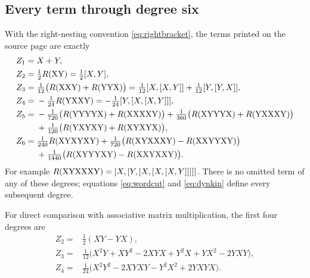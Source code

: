 \subsection{Every term through degree six}
With the right-nesting convention \eqref{eq:rightbracket}, the terms printed
on the source page are exactly
\begin{align}
 Z_1={}&X+Y,\label{eq:z1}\\
 Z_2={}&\tfrac12R(\mathrm{XY})=\tfrac12[X,Y],\label{eq:z2}\\
 Z_3={}&\tfrac1{12}\bigl(R(\mathrm{XXY})+R(\mathrm{YYX})\bigr)
       =\tfrac1{12}[X,[X,Y]]+\tfrac1{12}[Y,[Y,X]],\label{eq:z3}\\
 Z_4={}&-\tfrac1{24}R(\mathrm{YXXY})=-\tfrac1{24}[Y,[X,[X,Y]]],\label{eq:z4}\\
 Z_5={}&-\tfrac1{720}\bigl(R(\mathrm{YYYYX})+R(\mathrm{XXXXY})\bigr)
       +\tfrac1{360}\bigl(R(\mathrm{XYYYX})+R(\mathrm{YXXXY})\bigr)
       \notag\\
     &+\tfrac1{120}\bigl(R(\mathrm{YXYXY})+R(\mathrm{XYXYX})\bigr),\label{eq:z5}\\
 Z_6={}&\tfrac1{240}R(\mathrm{XYXYXY})
       +\tfrac1{720}\bigl(R(\mathrm{XYXXXY})-R(\mathrm{XXYYXY})\bigr)
       \notag\\
     &+\tfrac1{1440}\bigl(R(\mathrm{XYYYXY})-R(\mathrm{XXYXXY})\bigr).\label{eq:z6}
\end{align}
For example $R(\mathrm{XYXXXY})=[X,[Y,[X,[X,[X,Y]]]]]$. There is no omitted term
of any of these degrees; equations \eqref{eq:wordcut} and
\eqref{eq:dynkin} define every subsequent degree.

For direct comparison with associative matrix multiplication, the first
four degrees are
\begin{align}
 Z_2={}&\tfrac12(XY-YX),\label{eq:assoc2}\\
 Z_3={}&\tfrac1{12}\bigl(X^2Y+XY^2-2XYX+Y^2X+YX^2-2YXY\bigr),\label{eq:assoc3}\\
 Z_4={}&\tfrac1{24}\bigl(X^2Y^2-2XYXY-Y^2X^2+2YXYX\bigr).\label{eq:assoc4}
\end{align}

